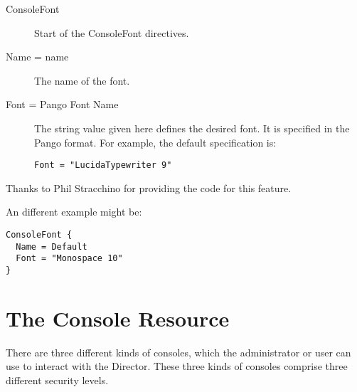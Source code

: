 \begin{description}

\item [ConsoleFont]
   Start of the ConsoleFont directives. 

\item [Name = \lt{}name\gt{}]
   The name of the font. 

\item [Font = \lt{}Pango Font Name\gt{}]
   The string value given here defines the desired font. It  is specified in the
   Pango format. For example, the default specification is: 

\footnotesize
\begin{verbatim}
Font = "LucidaTypewriter 9"
\end{verbatim}
\normalsize

\end{description}

Thanks to Phil Stracchino for providing the code for this feature. 

An different example might be: 

\footnotesize
\begin{verbatim}
ConsoleFont {
  Name = Default
  Font = "Monospace 10"
}
\end{verbatim}
\normalsize

\section{The Console Resource}
\label{ConsoleResource}

There are three different kinds of consoles, which the administrator or
user can use to interact with the Director.  These three kinds of consoles
comprise three different security levels.

